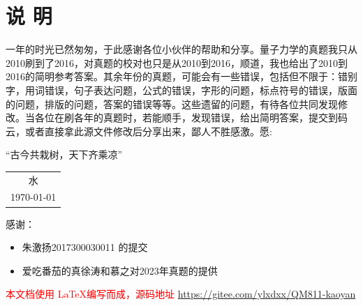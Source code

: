 \chapter*{说 \quad 明}
\thispagestyle{empty}




一年的时光已然匆匆，于此感谢各位小伙伴的帮助和分享。量子力学的真题我只从2010刷到了2016，对真题的校对也只是从2010到2016，顺道，我也给出了2010到2016的简明参考答案。其余年份的真题，可能会有一些错误，包括但不限于：错别字，用词错误，句子表达问题，公式的错误，字形的问题，标点符号的错误，版面的问题，排版的问题，答案的错误等等。这些遗留的问题，有待各位共同发现修改。当各位在刷各年的真题时，若能顺手，发现错误，给出简明答案，提交到码云，或者直接拿此源文件修改后分享出来，鄙人不胜感激。愿:
\begin{center}
	\kaishu 
	“古今共栽树，天下齐乘凉”
\end{center}
\begin{center}
	\flushright
\begin{tabular}{c}
	水   \\
	\today
\end{tabular}	
\end{center}


\vfil
\noindent
{感谢：}
\begin{itemize}
	\item 
	朱激扬2017300030011 的提交
	\item 
	爱吃番茄的真徐涛和慕之对2023年真题的提供
\end{itemize}
\vfil
\noindent
\textcolor{red}{本文档使用 \LaTeX 编写而成，源码地址 \url{https://gitee.com/ylxdxx/QM811-kaoyan}  }
\vfil

\pagestyle{mypagestyle}

